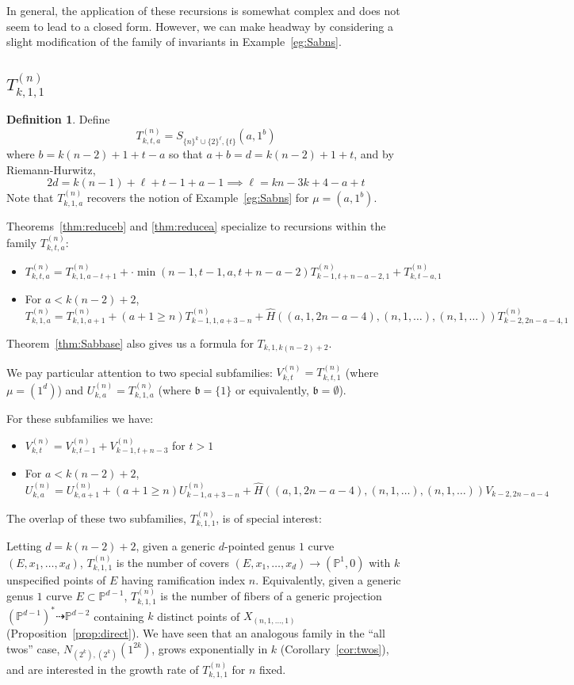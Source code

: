\documentclass[11pt]{article}           %
\renewcommand{\b}{\mathfrak b}
\renewcommand{\P}{\mathbb P}
\theoremstyle{definition}
\newtheorem{dfn}[thm]{Definition}
\begin{document}
In general, the application of these recursions is somewhat complex and
does not seem to lead to a closed form. However, we can make headway
by considering a slight modification of the family of invariants
in Example~\ref{eg:Sabns}.


\subsection{$T_{k,1,1}^{(n)}$}

\begin{dfn}
  Define
  \[
  T_{k,t,a}^{(n)}=S_{\{n\}^k\cup\{2\}^{\ell},\{t\}}(a,1^b)
  \]
  where $b=k(n-2)+1+t-a$ so that $a+b=d=k(n-2)+1+t$, and
  by Riemann-Hurwitz,
  \[
  2d=k(n-1)+\ell+t-1+a-1\implies \ell=kn-3k+4-a+t
  \]
  Note that $T_{k,1,a}^{(n)}$
  recovers the notion of Example~\ref{eg:Sabns} for $\mu=(a,1^b)$.
  \end{dfn}

Theorems~\ref{thm:reduceb} and \ref{thm:reducea} specialize to recursions
within the family $T_{k,t,a}^{(n)}$:
\begin{itemize}
\item $T_{k,t,a}^{(n)}=T_{k,1,a-t+1}^{(n)}+\cdot\min(n-1,t-1,a,t+n-a-2)T_{k-1,t+n-a-2,1}^{(n)}+ T_{k,t-a,1}^{(n)}$
  \item For $a<k(n-2)+2$, \[T_{k,1,a}^{(n)}=T_{k,1,a+1}^{(n)}+(a+1\geq n)T_{k-1,1,a+3-n}^{(n)}+\hat H((a,1,2n-a-4),(n,1,\dots),(n,1,\dots))T_{k-2,2n-a-4,1}^{(n)}\]
\end{itemize}
Theorem~\ref{thm:Sabbase} also gives us a formula for
$T_{k,1,k(n-2)+2}$.

We pay particular attention to two special subfamilies:
$V_{k,t}^{(n)}=T_{k,t,1}^{(n)}$ (where $\mu=(1^d)$) and $U_{k,a}^{(n)}=T_{k,1,a}^{(n)}$
(where $\b=\{1\}$ or equivalently, $\b=\emptyset$). 

For these subfamilies we have:
\begin{itemize}
\item $V_{k,t}^{(n)}=V_{k,t-1}^{(n)}+V_{k-1,t+n-3}^{(n)}$ for $t>1$
  \item For $a<k(n-2)+2$, \[U_{k,a}^{(n)}=U_{k,a+1}^{(n)}+(a+1\geq n)U_{k-1,a+3-n}^{(n)}+\hat H((a,1,2n-a-4),(n,1,\dots),(n,1,\dots)) V_{k-2,2n-a-4}\]
\end{itemize}

The overlap of these two subfamilies, $T_{k,1,1}^{(n)}$, is of special interest:

Letting $d=k(n-2)+2$,
given a generic $d$-pointed genus $1$ curve $(E,x_1,\dots,x_d)$,
$T_{k,1,1}^{(n)}$ is the number of covers $(E,x_1,\dots,x_d)\to(\P^1,0)$
with $k$ unspecified points of $E$ having ramification index $n$.
Equivalently, given a generic genus $1$ curve $E\subset \P^{d-1}$,
$T_{k,1,1}^{(n)}$ is the number of fibers of a generic projection
$(\P^{d-1})^*\dashrightarrow\P^{d-2}$ containing $k$ distinct points
of $X_{(n,1,\dots,1)}$ (Proposition~\ref{prop:direct}).
We have
seen that an analogous family in the ``all twos'' case, $N_{(2^k),(2^k)}(1^{2k})$,
grows exponentially in $k$ (Corollary~\ref{cor:twos}), and are interested
in the growth rate of $T_{k,1,1}^{(n)}$ for $n$ fixed.
\end{document}
